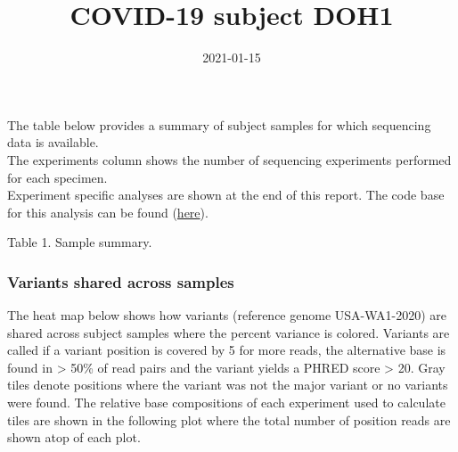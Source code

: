 \documentclass[12pt,]{article}
\title{COVID-19 subject DOH1}
\author{}
\date{2021-01-15}
\begin{document}
\maketitle

The table below provides a summary of subject samples for which
sequencing data is available.\\
The experiments column shows the number of sequencing experiments
performed for each specimen.\\
Experiment specific analyses are shown at the end of this report. The
code base for this analysis can be found
(\href{https://github.com/everettJK/SARS-CoV-2-Philadelphia}{here}).

\vspace{0.5cm}

\small
Table 1. Sample summary. \normalsize

\begin{table}[H]
\centering
{}
\end{table}

\newpage

\subsubsection{Variants shared across
samples}\label{variants-shared-across-samples}

The heat map below shows how variants (reference genome USA-WA1-2020)
are shared across subject samples where the percent variance is colored.
Variants are called if a variant position is covered by 5 for more
reads, the alternative base is found in \textgreater{} 50\% of read
pairs and the variant yields a PHRED score \textgreater{} 20. Gray tiles
denote positions where the variant was not the major variant or no
variants were found. The relative base compositions of each experiment
used to calculate tiles are shown in the following plot where the total
number of position reads are shown atop of each plot.
\end{document}
